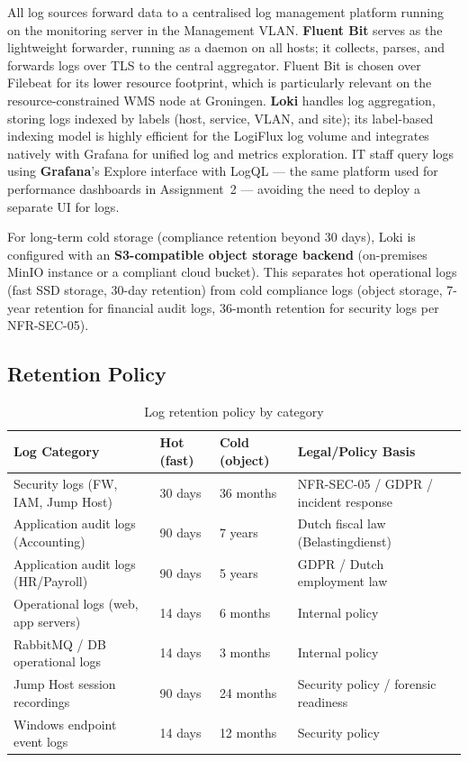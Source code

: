 All log sources forward data to a centralised log management platform running on the monitoring server in the Management VLAN. \textbf{Fluent Bit} serves as the lightweight forwarder, running as a daemon on all hosts; it collects, parses, and forwards logs over TLS to the central aggregator. Fluent Bit is chosen over Filebeat for its lower resource footprint, which is particularly relevant on the resource-constrained WMS node at Groningen. \textbf{Loki} handles log aggregation, storing logs indexed by labels (host, service, VLAN, and site); its label-based indexing model is highly efficient for the LogiFlux log volume and integrates natively with Grafana for unified log and metrics exploration. IT staff query logs using \textbf{Grafana}'s Explore interface with LogQL --- the same platform used for performance dashboards in Assignment~2 --- avoiding the need to deploy a separate UI for logs.

For long-term cold storage (compliance retention beyond 30 days), Loki is configured with an \textbf{S3-compatible object storage backend} (on-premises MinIO instance or a compliant cloud bucket). This separates hot operational logs (fast SSD storage, 30-day retention) from cold compliance logs (object storage, 7-year retention for financial audit logs, 36-month retention for security logs per NFR-SEC-05).

\subsection{Retention Policy}

\begin{table}[H]
\centering
\begin{tabularx}{\textwidth}{lllX}
\toprule
\textbf{Log Category} & \textbf{Hot (fast)} & \textbf{Cold (object)} & \textbf{Legal/Policy Basis} \\
\midrule
Security logs (FW, IAM, Jump Host) & 30 days & 36 months & NFR-SEC-05 / GDPR / incident response \\
Application audit logs (Accounting) & 90 days & 7 years & Dutch fiscal law (Belastingdienst) \\
Application audit logs (HR/Payroll) & 90 days & 5 years & GDPR / Dutch employment law \\
Operational logs (web, app servers) & 14 days & 6 months & Internal policy \\
RabbitMQ / DB operational logs & 14 days & 3 months & Internal policy \\
Jump Host session recordings & 90 days & 24 months & Security policy / forensic readiness \\
Windows endpoint event logs & 14 days & 12 months & Security policy \\
\bottomrule
\end{tabularx}
\caption{Log retention policy by category}
\label{tab:retention}
\end{table}

